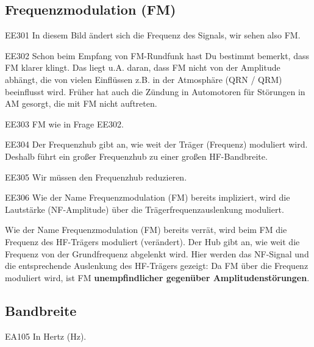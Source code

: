 \subsection{Frequenzmodulation (FM)}
\begin{sol}{EE301}
  In diesem Bild ändert sich die Frequenz des Signals, wir sehen also FM.
\end{sol}

\begin{sol}{EE302}
  Schon beim Empfang von FM-Rundfunk hast Du bestimmt bemerkt, dass FM klarer klingt. Das liegt u.A. daran, dass FM nicht von der Amplitude abhängt, die von vielen Einflüssen z.B. in der Atmosphäre (QRN / QRM) beeinflusst wird.
  Früher hat auch die Zündung in Automotoren für Störungen in AM gesorgt, die mit FM nicht auftreten.
\end{sol}

\begin{sol}{EE303}
  FM wie in Frage EE302.
\end{sol}

\begin{sol}{EE304}
  Der Frequenzhub gibt an, wie weit der Träger (Frequenz) moduliert wird. Deshalb führt ein großer Frequenzhub zu einer großen HF-Bandbreite.
\end{sol}

\begin{sol}{EE305}
 Wir müssen den Frequenzhub reduzieren.
\end{sol}

\begin{sol}{EE306}
  Wie der Name Frequenzmodulation (FM) bereits impliziert, wird die Lautstärke (NF-Amplitude) über die Trägerfrequenzauslenkung moduliert.  
\end{sol}

\begin{ohmchapter}
  Wie der Name Frequenzmodulation (FM) bereits verrät, wird beim FM die Frequenz des HF-Trägers moduliert (verändert). Der Hub gibt an, wie weit die Frequenz von der Grundfrequenz abgelenkt wird. Hier werden das NF-Signal und die entsprechende Auslenkung des HF-Trägers gezeigt:
  Da FM über die Frequenz moduliert wird, ist FM \textbf{unempfindlicher gegenüber Amplitudenstörungen}.
\end{ohmchapter}  

\subsection{Bandbreite}
\begin{sol}{EA105}
  In Hertz (Hz).
\end{sol}

